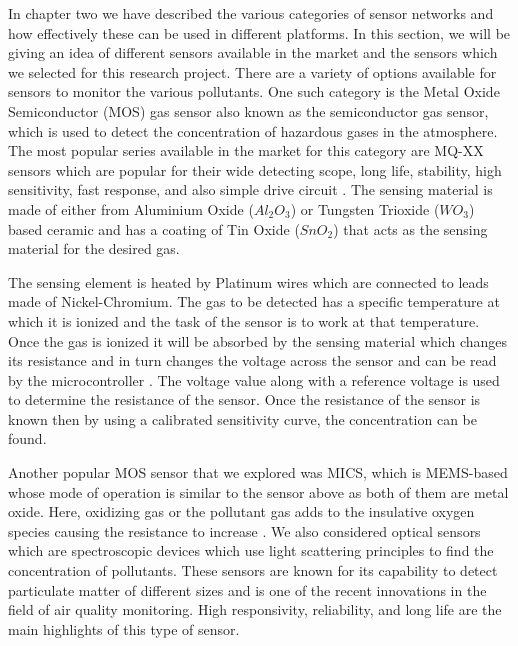 In chapter two we have described the various categories of sensor networks and how effectively these can be used in different platforms. In this section, we will be giving an idea of different sensors available in the market and the sensors which we selected for this research project.
There are a variety of options available for sensors to monitor the various pollutants. One such category is the Metal Oxide Semiconductor (MOS) gas sensor also known as the semiconductor gas sensor, which is used to detect the concentration of hazardous gases in the atmosphere. The most popular series available in the market for this category are MQ-XX sensors which are popular for their wide detecting scope, long life, stability, high sensitivity, fast response, and also simple drive circuit \cite{Data2012}. The sensing material is made of either from Aluminium Oxide ($ Al_{2}O_{3}$) or Tungsten Trioxide ($WO_3$) based ceramic and has a coating of Tin Oxide ($ SnO_{2} $) that acts as the sensing material for the desired gas. 

The sensing element is heated by Platinum wires which are connected to leads made of Nickel-Chromium. The gas to be detected has a specific temperature at which it is ionized and the task of the sensor is to work at that temperature. Once the gas is ionized it will be absorbed by the sensing material which changes its resistance and in turn changes the voltage across the sensor and can be read by the microcontroller \cite{gassensor}. The voltage value along with a reference voltage is used to determine the resistance of the sensor. Once the resistance of the sensor is known then by using a calibrated sensitivity curve, the concentration can be found. 

Another popular MOS sensor that we explored was MICS, which is MEMS-based whose mode of operation is similar to the sensor above as both of them are metal oxide. Here, oxidizing gas or the pollutant gas adds to the insulative oxygen species causing the resistance to increase \cite{SGXSensortech}.
 We also considered optical sensors which are spectroscopic devices which use light scattering principles to find the concentration of pollutants. These sensors are known for its capability to detect particulate matter of different sizes and is one of the recent innovations in the field of air quality monitoring. High responsivity, reliability, and long life are the main highlights of this type of sensor.
 
